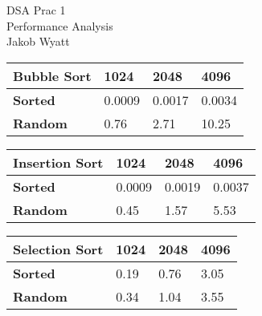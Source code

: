 \documentclass{article}
\begin{document}
\begin{center}
\Huge
DSA Prac 1 \\
\huge
Performance Analysis \\
\Large
Jakob Wyatt \\
\end{center}
\large

\begin{table}[H]
\centering
\begin{tabularx}{\linewidth}{| X | X | X | X |}
\hline
\textbf{Bubble Sort} & \textbf{1024} & \textbf{2048} & \textbf{4096} \\
\hline
\textbf{Sorted} & 0.0009 & 0.0017 & 0.0034 \\
\hline
\textbf{Random}  & 0.76 & 2.71 & 10.25 \\
\hline
\end{tabularx}
\end{table}

\begin{table}[H]
\centering
\begin{tabularx}{\linewidth}{| X | X | X | X |}
\hline
\textbf{Insertion Sort} & \textbf{1024} & \textbf{2048} & \textbf{4096} \\
\hline
\textbf{Sorted} & 0.0009 & 0.0019 & 0.0037 \\
\hline
\textbf{Random}  & 0.45 & 1.57 & 5.53 \\
\hline
\end{tabularx}
\end{table}

\begin{table}[H]
\centering
\begin{tabularx}{\linewidth}{| X | X | X | X |}
\hline
\textbf{Selection Sort} & \textbf{1024} & \textbf{2048} & \textbf{4096} \\
\hline
\textbf{Sorted} & 0.19 & 0.76 & 3.05 \\
\hline
\textbf{Random}  & 0.34 & 1.04 & 3.55 \\
\hline
\end{tabularx}
\end{table}
\end{document}
